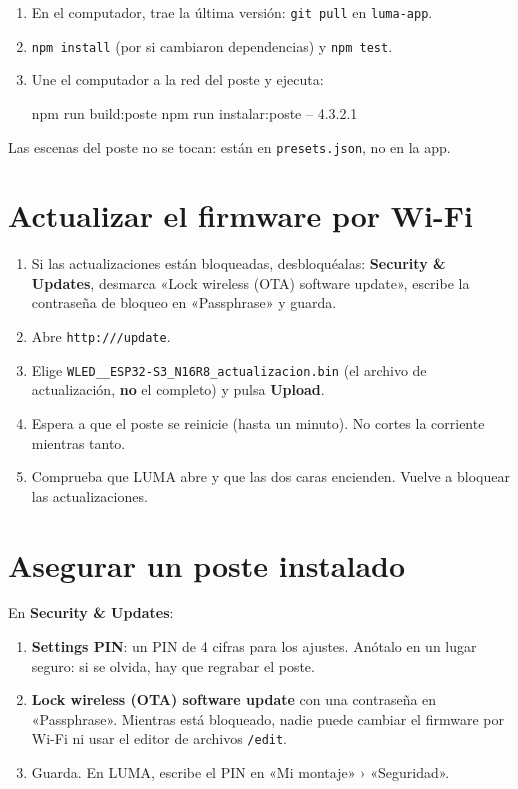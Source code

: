 \begin{enumerate}
\item En el computador, trae la última versión: \texttt{git pull} en \texttt{luma-app}.
\item \texttt{npm install} (por si cambiaron dependencias) y \texttt{npm test}.
\item Une el computador a la red del poste y ejecuta:
\begin{comando}
npm run build:poste
npm run instalar:poste -- 4.3.2.1
\end{comando}
\end{enumerate}
Las escenas del poste no se tocan: están en \texttt{presets.json}, no en la app.

\section{Actualizar el firmware por Wi-Fi}


\begin{enumerate}
\item Si las actualizaciones están bloqueadas, desbloquéalas: \textbf{Security \& Updates}, desmarca «Lock wireless (OTA) software update», escribe la contraseña de bloqueo en «Passphrase» y guarda.
\item Abre \texttt{http:///update}.
\item Elige \texttt{WLED\_\_ESP32-S3\_N16R8\_actualizacion.bin} (el archivo de actualización, \textbf{no} el completo) y pulsa \textbf{Upload}.
\item Espera a que el poste se reinicie (hasta un minuto). No cortes la corriente mientras tanto.
\item Comprueba que LUMA abre y que las dos caras encienden. Vuelve a bloquear las actualizaciones.
\end{enumerate}


\section{Asegurar un poste instalado}

En \textbf{Security \& Updates}:
\begin{enumerate}
\item \textbf{Settings PIN}: un PIN de 4 cifras para los ajustes. Anótalo en un lugar seguro: si se olvida, hay que regrabar el poste.
\item \textbf{Lock wireless (OTA) software update} con una contraseña en «Passphrase». Mientras está bloqueado, nadie puede cambiar el firmware por Wi-Fi ni usar el editor de archivos \texttt{/edit}.
\item Guarda. En LUMA, escribe el PIN en «Mi montaje» › «Seguridad».
\end{enumerate}

